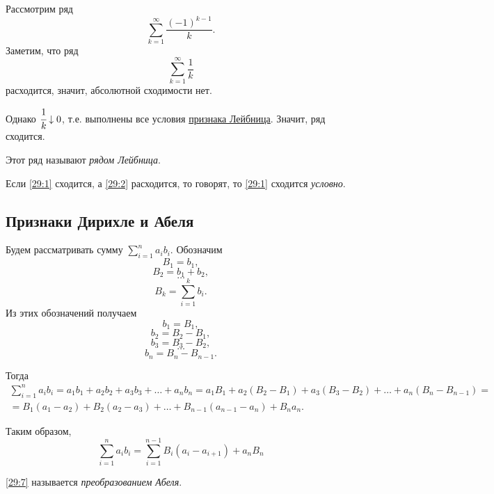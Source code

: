 \documentclass[../../main.tex]{subfiles}
\begin{document}
	\begin{example}
		Рассмотрим ряд
		\[\sum_{k = 1}^\infty\frac{(-1)^{k - 1}}{k}.\]
		Заметим, что ряд
		\[\sum_{k = 1}^\infty\frac{1}{k}\]
		расходится, значит, абсолютной сходимости нет.
		
		Однако $\cfrac{1}{k}\downarrow0$, т.е. выполнены все условия \href{29:leibnitz}{признака Лейбница}. Значит, ряд сходится.
		
		Этот ряд называют \emph{рядом Лейбница}.
	\end{example}

\begin{definition}
	Если \eqref{29:1} сходится, а \eqref{29:2} расходится, то говорят, то \eqref{29:1} сходится \emph{условно}.
\end{definition}
	
	\subsection{Признаки Дирихле и Абеля}
	
	Будем рассматривать сумму $\sum\limits_{i = 1}^n a_ib_i$. Обозначим
	\[B_1 = b_1,\]
	\[B_2 = b_1 + b_2,\]
	\[\ldots\]
	\[B_k = \sum_{i=1}^k b_i.\]
	Из этих обозначений получаем
	\[b_1 = B_1,\]
	\[b_2 = B_2 - B_1,\]
	\[b_3 = B_3 - B_2,\]
	\[\ldots\]
	\[b_n = B_n - B_{n - 1}.\]
	
	Тогда
	\begin{gather*}
		\sum_{i = 1}^n a_ib_i = a_1b_1 + a_2b_2 + a_3b_3 + \ldots + a_nb_n = a_1B_1 + a_2(B_2 - B_1) + a_3(B_3 - B_2) + \ldots + a_n(B_n - B_{n - 1}) = \\
		= B_1(a_1 - a_2) + B_2(a_2 - a_3) + \ldots + B_{n - 1}(a_{n - 1} - a_n) + B_na_n.
	\end{gather*}
	
	Таким образом,
	\begin{equation}
		\sum_{i = 1}^na_ib_i = \sum_{i = 1}^{n - 1}B_i(a_i - a_{i + 1}) + a_nB_n
		\label{29:7}
	\end{equation}
	
	\begin{definition}
		\eqref{29:7} называется \emph{преобразованием Абеля}.
	\end{definition}
	
\end{document}
